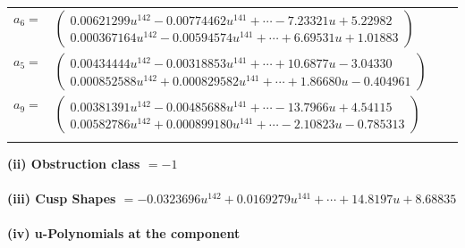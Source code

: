 \documentclass[1p]{elsarticle_modified}
\theoremstyle{definition}
\begin{document}
\begin{tabular}{m{7pt} m{180pt} m{7pt} m{180pt} }
\flushright $a_{6}=$&$\begin{pmatrix}0.00621299 u^{142}-0.00774462 u^{141}+\cdots-7.23321 u+5.22982\\0.000367164 u^{142}-0.00594574 u^{141}+\cdots+6.69531 u+1.01883\end{pmatrix}$ \\
\flushright $a_{5}=$&$\begin{pmatrix}0.00434444 u^{142}-0.00318853 u^{141}+\cdots+10.6877 u-3.04330\\0.000852588 u^{142}+0.000829582 u^{141}+\cdots+1.86680 u-0.404961\end{pmatrix}$ \\
\flushright $a_{9}=$&$\begin{pmatrix}0.00381391 u^{142}-0.00485688 u^{141}+\cdots-13.7966 u+4.54115\\0.00582786 u^{142}+0.000899180 u^{141}+\cdots-2.10823 u-0.785313\end{pmatrix}$\\&\end{tabular}
\flushleft \textbf{(ii) Obstruction class $= -1$}\\~\\
\flushleft \textbf{(iii) Cusp Shapes $= -0.0323696 u^{142}+0.0169279 u^{141}+\cdots+14.8197 u+8.68835$}\\~\\
\newpage\renewcommand{\arraystretch}{1}
\flushleft \textbf{(iv) u-Polynomials at the component}\newline \\
\end{document}
